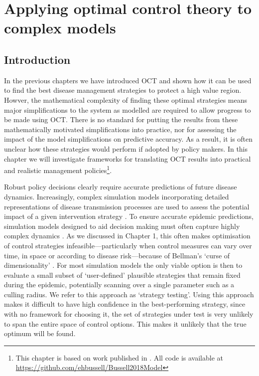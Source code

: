 %
\chapter{Applying optimal control theory to complex models\label{ch:complex_models}}

\section{Introduction\label{sec:ch4:Intro}}

In the previous chapters we have introduced OCT and shown how it can be used to find the best disease management strategies to protect a high value region. Howver, the mathematical complexity of finding these optimal strategies means major simplifications to the system as modelled are required to allow progress to be made using OCT\@. There is no standard for putting the results from these mathematically motivated simplifications into practice, nor for assessing the impact of the model simplifications on predictive accuracy. As a result, it is often unclear how these strategies would perform if adopted by policy makers. In this chapter we will investigate frameworks for translating OCT results into practical and realistic management policies\footnote{This chapter is based on work published in \citet{bussell_applying_2019}. All code is available at \url{https://github.com/ehbussell/Bussell2018Model}}.

Robust policy decisions clearly require accurate predictions of future disease dynamics. Increasingly, complex simulation models incorporating detailed representations of disease transmission processes are used to assess the potential impact of a given intervention strategy \citep{lofgren_opinion_2014}. To ensure accurate epidemic predictions, simulation models designed to aid decision making must often capture highly complex dynamics \citep{savary_simulation_2014}. As we discussed in Chapter 1, this often makes optimisation of control strategies infeasible---particularly when control measures can vary over time, in space or according to disease risk---because of Bellman's `curse of dimensionality' \citep{bellman_dynamic_1957}. For most simulation models the only viable option is then to evaluate a small subset of `user-defined' plausible strategies that remain fixed during the epidemic, potentially scanning over a single parameter such as a culling radius. We refer to this approach as `strategy testing'. Using this approach makes it difficult to have high confidence in the best-performing strategy, since with no framework for choosing it, the set of strategies under test is very unlikely to span the entire space of control options. This makes it unlikely that the true optimum will be found.

